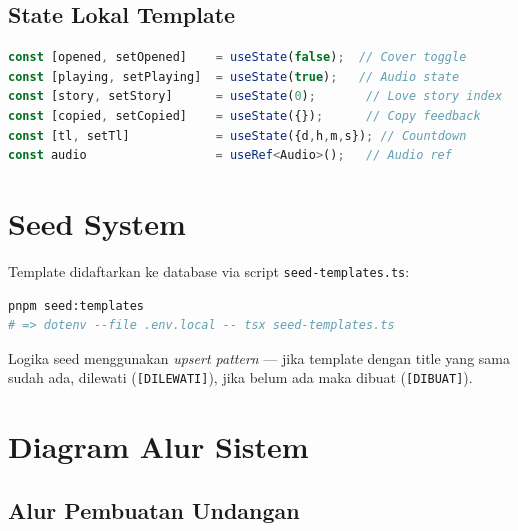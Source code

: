 \documentclass[12pt,a4paper]{article}
\begin{document}
\subsection{State Lokal Template}

\begin{lstlisting}[language=typescript, caption=State Template]
const [opened, setOpened]    = useState(false);  // Cover toggle
const [playing, setPlaying]  = useState(true);   // Audio state
const [story, setStory]      = useState(0);       // Love story index
const [copied, setCopied]    = useState({});      // Copy feedback
const [tl, setTl]            = useState({d,h,m,s}); // Countdown
const audio                  = useRef<Audio>();   // Audio ref
\end{lstlisting}

\section{Seed System}

Template didaftarkan ke database via script \texttt{seed-templates.ts}:

\begin{lstlisting}[language=bash, caption=Menjalankan Seed]
pnpm seed:templates
# => dotenv --file .env.local -- tsx seed-templates.ts
\end{lstlisting}

Logika seed menggunakan \textit{upsert pattern} — jika template dengan
title yang sama sudah ada, dilewati (\texttt{[DILEWATI]}), jika belum
ada maka dibuat (\texttt{[DIBUAT]}).

\section{Diagram Alur Sistem}

\subsection{Alur Pembuatan Undangan}
\end{document}
